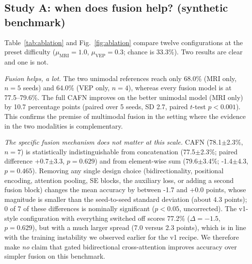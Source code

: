 \documentclass{ieeeaccessapprox}
\begin{document}
\subsection{Study A: when does fusion help? (synthetic benchmark)}\label{sec:studyA}
Table~\ref{tab:ablation} and Fig.~\ref{fig:ablation} compare twelve configurations at the preset difficulty ($\mu_{\mathrm{MRI}}{=}1.0$, $\mu_{\mathrm{VEP}}{=}0.3$; chance is 33.3\%). Two results are clear and one is not.

\emph{Fusion helps, a lot.} The two unimodal references reach only 68.0\% (MRI only, $n{=}5$ seeds) and 64.0\% (VEP only, $n{=}4$), whereas every fusion model is at 77.5--79.6\%. The full CAFN improves on the better unimodal model (MRI only) by 10.7 percentage points (paired over 5 seeds, SD 2.7, paired $t$-test $p<0.001$). This confirms the premise of multimodal fusion in the setting where the evidence in the two modalities is complementary.

\emph{The specific fusion mechanism does not matter at this scale.} CAFN (78.1$\pm$2.3\%, $n{=}7$) is statistically indistinguishable from concatenation (77.5$\pm$2.3\%; paired difference +0.7$\pm$3.3, $p=0.629$) and from element-wise sum (79.6$\pm$3.4\%; -1.4$\pm$4.3, $p=0.465$). Removing any single design choice (bidirectionality, positional encoding, attention pooling, SE blocks, the auxiliary loss, or adding a second fusion block) changes the mean accuracy by between -1.7 and +0.0 points, whose magnitude is smaller than the seed-to-seed standard deviation (about 4.3 points); 0 of 7 of these differences is nominally significant ($p<0.05$, uncorrected). The v1-style configuration with everything switched off scores 77.2\% ($\Delta=-1.5$, $p=0.629$), but with a much larger spread (7.0 versus 2.3 points), which is in line with the training instability we observed earlier for the v1 recipe. We therefore make \emph{no} claim that gated bidirectional cross-attention improves accuracy over simpler fusion on this benchmark.
\end{document}
